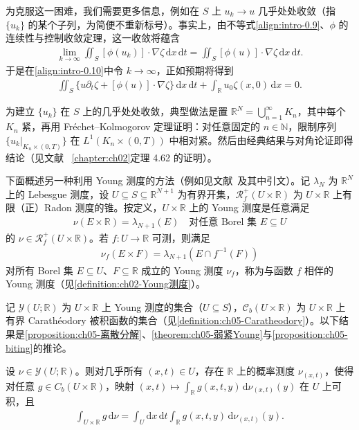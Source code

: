 \documentclass[../main.tex]{subfiles}
\begin{document}
为克服这一困难，我们需要更多信息，例如在 $S$ 上 $u_k\to u$ 几乎处处收敛（指 $\{u_k\}$ 的某个子列，为简便不重新标号）。事实上，由不等式\eqref{align:intro-0.9}、$\phi$ 的连续性与控制收敛定理，这一收敛将蕴含
\begin{align*}
\lim_{k\to\infty}\iint_S[\phi(u_k)]\cdot\nabla\zeta\,\mathrm{d}x\,\mathrm{d}t
= \iint_S[\phi(u)]\cdot\nabla\zeta\,\mathrm{d}x\,\mathrm{d}t.
\end{align*}
于是在\eqref{align:intro-0.10}中令 $k\to\infty$，正如预期将得到
\begin{align}
\iint_S\{u\partial_t\zeta + [\phi(u)]\cdot\nabla\zeta\}\,\mathrm{d}x\,\mathrm{d}t
+ \int_{\mathbb{R}}u_0\zeta(x,0)\,\mathrm{d}x = 0. \label{align:intro-0.11}
\end{align}

为建立 $\{u_k\}$ 在 $S$ 上的几乎处处收敛，典型做法是置 $\mathbb{R}^N=\bigcup_{n=1}^\infty K_n$，其中每个 $K_n$ 紧，再用 Fréchet--Kolmogorov 定理证明：对任意固定的 $n\in\mathbb{N}$，限制序列 $\{u_k|_{K_n\times(0,T)}\}$ 在 $L^1(K_n\times(0,T))$ 中相对紧。然后由经典结果与对角论证即得结论（见文献~\cite{ref68} \cref{chapter:ch02}定理 4.62 的证明）。

下面概述另一种利用 Young 测度的方法（例如见文献~\cite{ref68}及其中引文）。记 $\lambda_N$ 为 $\mathbb{R}^N$ 上的 Lebesgue 测度，设 $U\subseteq S\subseteq\mathbb{R}^{N+1}$ 为有界开集，$\mathscr{R}^+_f(U\times\mathbb{R})$ 为 $U\times\mathbb{R}$ 上有限（正）Radon 测度的锥。按定义，$U\times\mathbb{R}$ 上的 Young 测度是任意满足
\begin{align*}
\nu(E\times\mathbb{R}) = \lambda_{N+1}(E)
\quad \text{对任意 Borel 集 }E\subseteq U
\end{align*}
的 $\nu\in\mathscr{R}^+_f(U\times\mathbb{R})$。若 $f:U\to\mathbb{R}$ 可测，则满足
\begin{align*}
\nu_f(E\times F) = \lambda_{N+1}(E\cap f^{-1}(F))
\end{align*}
对所有 Borel 集 $E\subseteq U$、$F\subseteq\mathbb{R}$ 成立的 Young 测度 $\nu_f$，称为与函数 $f$ 相伴的 Young 测度（见\cref{definition:ch02-Young测度}）。

记 $\mathcal{Y}(U;\mathbb{R})$ 为 $U\times\mathbb{R}$ 上 Young 测度的集合（$U\subseteq S$），$\mathcal{C}_b(U\times\mathbb{R})$ 为 $U\times\mathbb{R}$ 上有界 Carathéodory 被积函数的集合（见\cref{definition:ch05-Caratheodory}）。以下结果是\cref{proposition:ch05-离散分解}、\cref{theorem:ch05-弱紧Young}与\cref{proposition:ch05-biting}的推论。

\begin{proposition}\label{proposition:intro-0.2.1}
设 $\nu\in\mathcal{Y}(U;\mathbb{R})$。则对几乎所有 $(x,t)\in U$，存在 $\mathbb{R}$ 上的概率测度 $\nu_{(x,t)}$，使得对任意 $g\in C_b(U\times\mathbb{R})$，映射 $(x,t)\mapsto\int_{\mathbb{R}}g(x,t,y)\,\mathrm{d}\nu_{(x,t)}(y)$ 在 $U$ 上可积，且
\begin{align*}
\int_{U\times\mathbb{R}}g\,\mathrm{d}\nu
= \int_U \mathrm{d}x\,\mathrm{d}t\int_{\mathbb{R}}g(x,t,y)\,\mathrm{d}\nu_{(x,t)}(y).
\end{align*}
\end{proposition}
\end{document}
